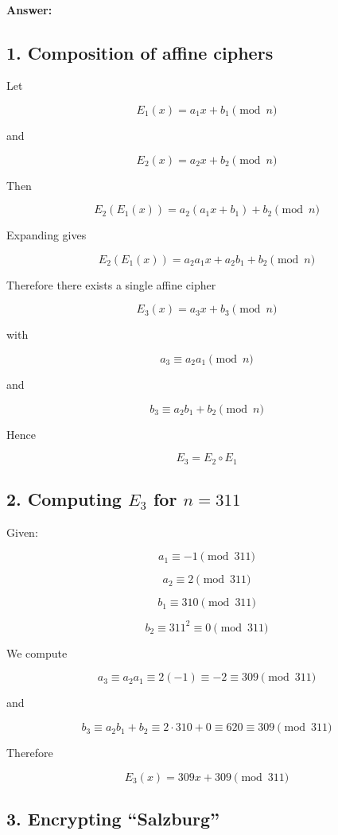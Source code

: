 \documentclass[]{scrartcl}
\begin{document}
\paragraph{Answer:} {\subsection*{1. Composition of affine ciphers}

Let

\[
E_1(x)=a_1x+b_1 \pmod n
\]

and

\[
E_2(x)=a_2x+b_2 \pmod n
\]

Then

\[
E_2(E_1(x))
=
a_2(a_1x+b_1)+b_2
\pmod n
\]

Expanding gives

\[
E_2(E_1(x))
=
a_2a_1x+a_2b_1+b_2
\pmod n
\]

Therefore there exists a single affine cipher

\[
E_3(x)=a_3x+b_3 \pmod n
\]

with

\[
a_3\equiv a_2a_1 \pmod n
\]

and

\[
b_3\equiv a_2b_1+b_2 \pmod n
\]

Hence

\[
E_3=E_2\circ E_1
\]



\subsection*{2. Computing \(E_3\) for \(n=311\)}

Given:

\[
a_1\equiv -1 \pmod{311}
\]

\[
a_2\equiv 2 \pmod{311}
\]

\[
b_1\equiv 310 \pmod{311}
\]

\[
b_2\equiv 311^2 \equiv 0 \pmod{311}
\]

We compute

\[
a_3
\equiv
a_2a_1
\equiv
2(-1)
\equiv
-2
\equiv
309
\pmod{311}
\]

and

\[
b_3
\equiv
a_2b_1+b_2
\equiv
2\cdot310+0
\equiv
620
\equiv
309
\pmod{311}
\]

Therefore

\[
E_3(x)=309x+309 \pmod{311}
\]



\subsection*{3. Encrypting ``Salzburg''}

}
\end{document}
